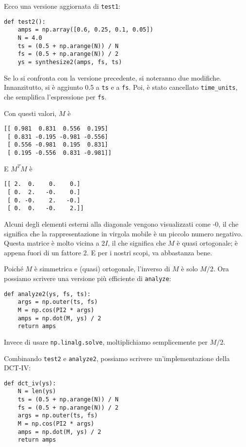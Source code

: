 \documentclass[12pt,a4paper]{book}
\begin{document}
Ecco una versione aggiornata di {\tt test1}:

\begin{verbatim} 
def test2():
    amps = np.array([0.6, 0.25, 0.1, 0.05])
    N = 4.0
    ts = (0.5 + np.arange(N)) / N
    fs = (0.5 + np.arange(N)) / 2
    ys = synthesize2(amps, fs, ts)
 \end{verbatim} 

Se lo si confronta con la versione precedente, si noteranno due modifiche. Innanzitutto, si è aggiunto 0.5 a {\tt ts} e a {\tt fs}. Poi, è stato cancellato \verb"time_units", che semplifica l'espressione per {\tt fs}.

Con questi valori, $M$ è

\begin{verbatim} 
[[ 0.981  0.831  0.556  0.195]
 [ 0.831 -0.195 -0.981 -0.556]
 [ 0.556 -0.981  0.195  0.831]
 [ 0.195 -0.556  0.831 -0.981]]
 \end{verbatim} 

E $M^TM$ è

\begin{verbatim} 
[[ 2.  0.    0.    0.]
 [ 0.  2.   -0.    0.]
 [ 0. -0.    2.   -0.]
 [ 0.  0.   -0.    2.]]
 \end{verbatim} 

Alcuni degli elementi esterni alla diagonale vengono visualizzati come -0, il che significa che la rappresentazione in virgola mobile è un piccolo numero negativo. Questa matrice è molto vicina a $2I$, il che significa che $M$ è quasi ortogonale; è appena fuori di un fattore 2. E per i nostri scopi, va abbastanza bene.

Poiché $M$ è simmetrica e (quasi) ortogonale, l'inverso di $M$ è solo $M/2$. Ora possiamo scrivere una versione più efficiente di {\tt analyze}:

\begin{verbatim} 
def analyze2(ys, fs, ts):
    args = np.outer(ts, fs)
    M = np.cos(PI2 * args)
    amps = np.dot(M, ys) / 2
    return amps
 \end{verbatim} 

Invece di usare {\tt np.linalg.solve}, moltiplichiamo semplicemente per $M/2$.

Combinando {\tt test2} e {\tt analyze2}, possiamo scrivere un'implementazione della DCT-IV:

\begin{verbatim} 
def dct_iv(ys):
    N = len(ys)
    ts = (0.5 + np.arange(N)) / N
    fs = (0.5 + np.arange(N)) / 2
    args = np.outer(ts, fs)
    M = np.cos(PI2 * args)
    amps = np.dot(M, ys) / 2
    return amps
 \end{verbatim} 
\end{document}
